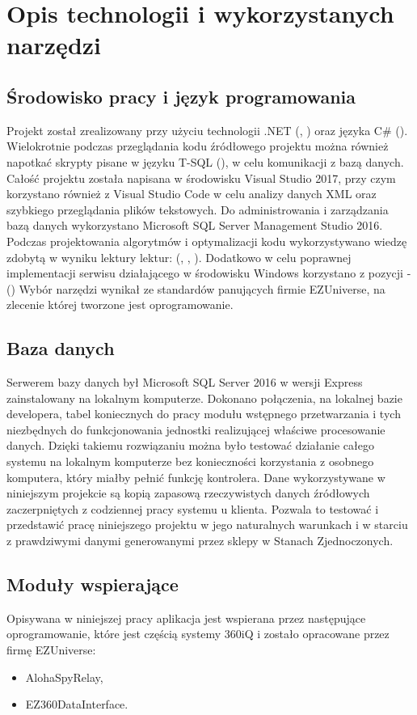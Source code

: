 \documentclass[a4paper]{book}
\begin{document}
\section{Opis technologii i wykorzystanych narzędzi}
\subsection{Środowisko pracy i język programowania}
Projekt został zrealizowany przy użyciu technologii .NET (\cite{aspnet}, \cite{aspnet}) oraz języka C\# (\cite{ruszglowa}).
Wielokrotnie podczas przeglądania kodu źródłowego projektu można również napotkać skrypty pisane w języku T-SQL (\cite{tsql}), w celu komunikacji z bazą danych.
Całość projektu została napisana w środowisku Visual Studio 2017, przy czym korzystano również z Visual Studio Code w celu analizy danych XML oraz szybkiego przeglądania plików tekstowych.
Do administrowania i zarządzania bazą danych wykorzystano Microsoft SQL Server Management Studio 2016.
Podczas projektowania algorytmów i optymalizacji kodu wykorzystywano wiedzę zdobytą w wyniku lektury lektur: (\cite{algorytmy}, \cite{perelki}, \cite{wzorceprojektowe}).
Dodatkowo w celu poprawnej implementacji serwisu działającego w środowisku Windows korzystano z pozycji - (\cite{progwin})
Wybór narzędzi wynikał ze standardów panujących firmie EZUniverse, na zlecenie której tworzone jest oprogramowanie.
\subsection{Baza danych}
Serwerem bazy danych był Microsoft SQL Server 2016 w wersji Express zainstalowany na lokalnym komputerze. Dokonano połączenia, na lokalnej bazie developera, tabel koniecznych do pracy modułu wstępnego przetwarzania i tych niezbędnych do funkcjonowania jednostki realizującej właściwe procesowanie danych.
Dzięki takiemu rozwiązaniu można było testować działanie całego systemu na lokalnym komputerze bez konieczności korzystania z osobnego komputera, który miałby pełnić funkcję kontrolera.
Dane wykorzystywane w niniejszym projekcie są kopią zapasową rzeczywistych danych źródłowych zaczerpniętych z codziennej pracy systemu u klienta. Pozwala to testować i przedstawić pracę niniejszego projektu w jego naturalnych warunkach i w starciu z prawdziwymi danymi generowanymi przez sklepy w Stanach Zjednoczonych.
\subsection{Moduły wspierające}
Opisywana w niniejszej pracy aplikacja jest wspierana przez następujące oprogramowanie, które jest częścią systemy 360iQ i zostało opracowane przez firmę EZUniverse:
 \begin{itemize}
 	\item AlohaSpyRelay,
 	\item EZ360DataInterface.
 \end{itemize}
\end{document}
